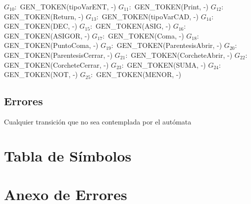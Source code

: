 \documentclass{article}
\begin{document}
\medskip \newline
\textnormal{$G_{10}:$ GEN\_TOKEN(tipoVarENT, -)}
\medskip \newline
\textnormal{$G_{11}:$ GEN\_TOKEN(Print, -)}
\medskip \newline
\textnormal{$G_{12}:$ GEN\_TOKEN(Return, -)}
\medskip \newline
\textnormal{$G_{13}:$ GEN\_TOKEN(tipoVarCAD, -)}
\medskip \newline
\textnormal{$G_{14}:$ GEN\_TOKEN(DEC, -)}
\medskip \newline
\textnormal{$G_{15}:$ GEN\_TOKEN(ASIG, -)}
\medskip \newline
\textnormal{$G_{16}:$ GEN\_TOKEN(ASIGOR, -)}
\medskip \newline
\textnormal{$G_{17}:$ GEN\_TOKEN(Coma, -)}
\medskip \newline
\textnormal{$G_{18}:$ GEN\_TOKEN(PuntoComa, -)}
\medskip \newline
\textnormal{$G_{19}:$ GEN\_TOKEN(ParentesisAbrir, -)}
\medskip \newline
\textnormal{$G_{20}:$ GEN\_TOKEN(ParentesisCerrar, -)}
\medskip \newline
\textnormal{$G_{21}:$ GEN\_TOKEN(CorcheteAbrir, -)}
\medskip \newline
\textnormal{$G_{22}:$ GEN\_TOKEN(CorcheteCerrar, -)}
\medskip \newline
\textnormal{$G_{23}:$ GEN\_TOKEN(SUMA, -)}
\medskip \newline
\textnormal{$G_{24}:$ GEN\_TOKEN(NOT, -)}
\medskip \newline
\textnormal{$G_{25}:$ GEN\_TOKEN(MENOR, -)}
\newpage
\subsection*{Errores}
\textnormal{Cualquier transición que no sea contemplada por el autómata}
\newpage
\section*{Tabla de Símbolos}
\newpage
\section*{Anexo de Errores}
\end{document}
